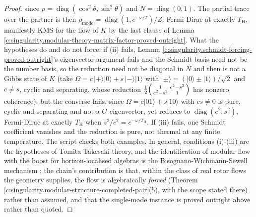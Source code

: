 \documentclass[11pt]{article}
\theoremstyle{definition}
\theoremstyle{plain}
\providecommand{\TH}{}\renewcommand{\TH}{T_{\mathrm{H}}}
\begin{document}
\begin{proof}
since $\rho = \operatorname{diag}(\cos^2\theta, \sin^2\theta)$ and $N = \operatorname{diag}(0,1)$. The partial trace over the partner is then $\rho_{\text{mode}} = \operatorname{diag}(1, e^{-\omega/T})/Z$: Fermi-Dirac at exactly $\TH$, manifestly KMS for the flow of $K$ by the last clause of Lemma \ref{c:singularity.modular-theory-matrix-factor-proved-outright}. What the hypotheses do and do not force: if (ii) fails, Lemma \ref{c:singularity.schmidt-forcing-proved-outright}'s eigenvector argument fails and the Schmidt basis need not be the number basis, so the reduction need not be diagonal in $N$ and then is not a Gibbs state of $K$ (take $\Omega = c\,|{+}\rangle|0\rangle + s\,|{-}\rangle|1\rangle$ with $|{\pm}\rangle = (|0\rangle \pm |1\rangle)/\sqrt2$ and $c \neq s$, cyclic and separating, whose reduction $\tfrac12\begin{psmallmatrix} 1 & c^{2} - s^{2} \\ c^{2} - s^{2} & 1\end{psmallmatrix}$ has nonzero coherence); but the converse fails, since $\Omega = c|01\rangle + s|10\rangle$ with $cs \neq 0$ is pure, cyclic and separating and not a $G$-eigenvector, yet reduces to $\operatorname{diag}(c^{2}, s^{2})$, Fermi-Dirac at exactly $\TH$ when $s^{2}/c^{2} = e^{-\omega/\TH}$. If (iii) fails, one Schmidt coefficient vanishes and the reduction is pure, not thermal at any finite temperature. The script checks both examples. In general, conditions (i)-(iii) are the hypotheses of Tomita-Takesaki theory, and the identification of modular flow with the boost for horizon-localised algebras is the Bisognano-Wichmann-Sewell mechanism \cite{BW1976, Sewell1982}; the chain's contribution is that, within the class of real rotor flows the geometry supplies, the flow is algebraically \emph{forced} (Theorem \ref{c:singularity.modular-structure-completed-pair}(5), with the scope stated there) rather than assumed, and that the single-mode instance is proved outright above rather than quoted.

\end{proof}
\end{document}
